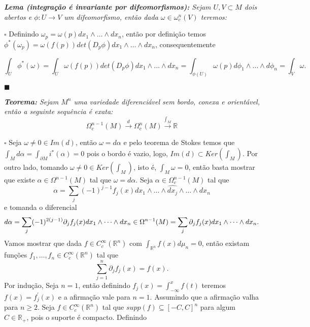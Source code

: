 \documentclass{article}
\begin{document}
	\vspace{2mm}
	\textit{\textbf{Lema (integração é invariante por difeomorfismos):} Sejam $U,V \subset M$ dois abertos e $\phi : U \to V $ um difeomorfismo, então dada $\omega \in \omega^{n}_{c}(V)$ teremos:}
	
	$\square$ Definindo $\omega_{p} = \omega(p) dx_{1} \wedge \dots \wedge dx_{n}$, então por definição temos $\phi^{*}(\omega_{p}) = \omega(f(p))det(D_{p}\phi) dx_{1} \wedge \dots \wedge dx_{n}$, consequentemente
	
	$$
	\int_{U} \phi^{*}(\omega) = \int_{U} \omega(f(p))det(D_{p}\phi) dx_{1} \wedge \dots \wedge dx_{n} = \int_{\phi(U)}\omega(p) d\phi_{1} \wedge \dots \wedge d\phi_{n} = \int_{V} \omega.
	$$
	
	$\blacksquare$
	
	\vspace{2mm}
	\textit{\textbf{Teorema:} Sejam $M^{n}$ uma variedade diferenciável sem bordo, conexa e orientável, então a seguinte sequência é exata:}
	$$
	\Omega^{n-1}_{c}(M) \xrightarrow{d} \Omega^{n}_{c}(M) \xrightarrow{\int_{M}} \mathbb{R}
	$$
	
	$\square$ Seja $\omega \neq 0 \in Im(d)$, então $\omega = d\alpha $ e pelo teorema de Stokes temos que $\int_{M} d\alpha = \int_{\partial M} i^{*}(\alpha) = 0$ pois o bordo é vazio, logo, $Im(d) \subset Ker(\int_{M})$. Por outro lado, tomando $\omega \neq 0 \in Ker(\int_{M})$, isto é, $\int_{M} \omega = 0$, então basta mostrar que existe $\alpha \in \Omega^{n-1}(M)$ tal que $\omega = d\alpha$. Seja $\alpha \in \Omega_{c}^{n-1}(M)$ tal que
	$$
	\alpha = \sum_{j} (-1)^{j-1}f_{j}(x) dx_{1} \wedge \dots \wedge \hat{dx_{j}} \wedge \dots \wedge dx_{n}
	$$	
	e tomanda o diferencial
	$$
	d\alpha = \sum_{j} (-1)^{2(j-1)}\partial_{j}f_{j}(x) dx_{1} \wedge \dots \wedge dx_{n}\in \Omega^{n-1}(M)
	\\
	= \sum_{j} \partial_{j}f_{j}(x) dx_{1} \wedge \dots \wedge dx_{n}.
	$$
	Vamos mostrar que dada $f \in C^{\infty}_{c}(\mathbb{R}^{n})$ com $\int_{\mathbb{R}^{n}} f(x)d\mu_{n} = 0$, então existam funções $f_{1}, \dots, f_{n} \in C^{\infty}_{c}(\mathbb{R}^{n})$ tal que 
	$$
	\sum_{j=1}^{n} \partial_{j}f_{j}(x) = f(x).
	$$
	Por indução, Seja $n=1$, então definindo $f_{j}(x) = \int_{-\infty}^{x}f(t)$ teremos $f(x) = f^{'}_{j}(x)$ e a afirmação vale para $n=1$. Assumindo que a afirmação valha para $n \geq 2$. Seja $f \in C^{\infty}_{c}(\mathbb{R}^{n})$ tal que $supp(f) \subseteq [-C, C]^{n}$ para algum $C \in \mathbb{R}_{+}$, pois o suporte é compacto. Definindo 
	
\end{document}
